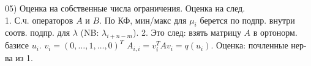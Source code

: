 05) Оценка на собственные числа ограничения. Оценка на след.\\
1. С.ч. операторов $A$ и $B$. По КФ, мин/макс для $\mu_i$ берется по подпр. внутри соотв. подпр. для $\lambda$ (NB: $\lambda_{i+n-m}$). 2. Это след: взять матрицу $A$ в ортонорм. базисе $u_i$. $v_i = (0,\dots,1,\dots,0)^T$ $A_{i,i} = v_i^TAv_i = q(u_i)$. Оценка: почленные нер-ва из 1.\\

